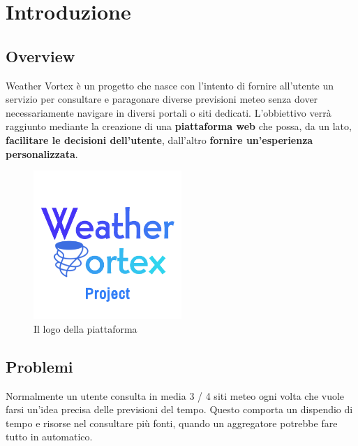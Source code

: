 

\chapter{Introduzione}


\section{Overview}
Weather Vortex è un progetto che nasce con l'intento di fornire all'utente un servizio per consultare e paragonare diverse previsioni meteo senza dover necessariamente navigare in diversi portali o siti dedicati. L'obbiettivo verrà raggiunto mediante la creazione di una \textbf{piattaforma web} che possa, da un lato, \textbf{facilitare le decisioni dell'utente}, dall'altro \textbf{fornire un'esperienza personalizzata}.

\begin{figure}[H]
    \caption{Il logo della piattaforma}
    \label{fig:Logo}
    \centering
    \includegraphics[width=0.5\textwidth]{Images/logo.png}
\end{figure}

\section{Problemi}
Normalmente un utente consulta in media 3 / 4 siti meteo ogni volta che vuole farsi un'idea precisa delle previsioni del tempo. Questo comporta un dispendio di tempo e risorse nel consultare più fonti, quando un aggregatore potrebbe fare tutto in automatico.

